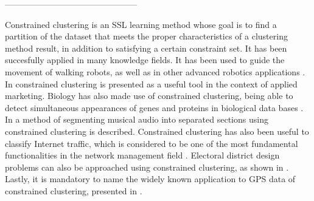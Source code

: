 -----------------------------------------------


Constrained clustering is an SSL learning method whose goal is to find a partition of the dataset that meets the proper characteristics of a clustering method result, in addition to satisfying a certain constraint set. It has been succesfully applied in many knowledge fields. It has been used to guide the movement of walking robots, as well as in other advanced robotics applications \cite{davidson2005clustering, semnani2016constrained}. In \cite{seret2014new} constrained clustering is presented as a useful tool in the context of applied marketing. Biology has also made use of constrained clustering, being able to detect simultaneous appearances of genes and proteins in biological data bases \cite{segal2003discovering}. In \cite{levy2008structural} a method of segmenting musical audio into separated sections using constrained clustering is described. Constrained clustering has also been useful to classify Internet traffic, which is considered to be one of the most fundamental functionalities in the network management field \cite{wang2014internet}. Electoral district design problems can also be approached using constrained clustering, as shown in \cite{brieden2017constrained}. Lastly, it is mandatory to name the widely known application to GPS data of constrained clustering, presented in \cite{wagstaff2001constrained}.